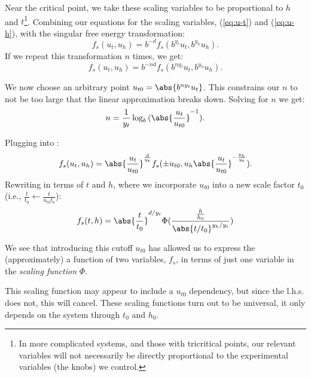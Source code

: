Near the critical point, we take these scaling variables to be
proportional to $h$ and $t$\footnote{In more complicated systems, and
  those with tricritical points, our relevant variables will not
  necessarily be directly proportional to the experimental variables
  (the knobs) we control.}. Combining our equations for the scaling
variables, (\ref{eq:u-t}) and (\ref{eq:u-h}), with the singular free
energy transformation:
\begin{equation}
  f_s(u_t,u_h)=b^{-d}f_s(b^{y_t}u_t,b^{y_h}u_h).
\end{equation}
If we repeat this transformation $n$ times, we get:
\begin{equation}%
  f_s(u_t,u_h)=b^{-nd}f_s(b^{ny_t}u_t, b^{y_h}u_h).\label{eq:f-repeated-transformations}
\end{equation}%

We now choose an arbitrary point $u_{t0}=\abs{b^{ny_t}u_t}$. This
constrains our $n$ to not be too large that the linear approximation
breaks down. Solving for $n$ we get:%
\begin{equation}
  n= \frac{1}{y_t} \log_b{(\abs{\frac{u_t}{u_{t0}}}^{-1})}.\label{eq:n-iterations}
\end{equation}

Plugging  into
:
\begin{equation}
  f_s(u_t,u_h)=\abs{\frac{u_t}{u_{t0}}}^{\frac{d}{y_t}}f_s(\pm u_{t0}, u_h\abs{\frac{u_t}{u_{t0}}}^{-\frac{y_h}{y_t}}).
\end{equation}
Rewriting in terms of $t$ and $h$, where we incorporate $u_{t0}$ into
a new scale factor $t_0$ (i.e.,
$\frac{t}{t_0}\leftarrow \frac{t}{u_{t0}t_0}$):%
\begin{equation}
  f_s(t,h)= \abs{\frac{t}{t_0}}^{d/y_t}\Phi(\frac{\frac{h}{h_0}}{\abs{t/t_0}^{y_h/y_t}})
\end{equation}

We see that introducing this cutoff $u_{t0}$ has allowed us to express the
(approximately) a function of two variables, $f_s$, in terms of just
one variable in the \textit{scaling function} $\Phi$.

This scaling function may appear to include a $u_{t0}$ dependency, but
since the l.h.s\@. does not, this will cancel. These scaling functions
turn out to be universal, it only depends on the system through $t_0$
and $h_0$.

